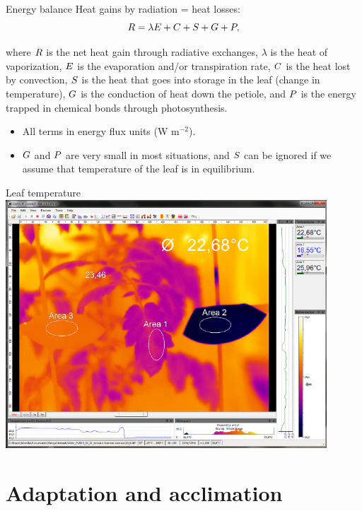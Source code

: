 \documentclass[10pt]{beamer}
\begin{document}
\begin{frame}{Energy balance}
    Heat gains by radiation = heat losses:
    $$\boldmath R = \lambda E + C + S + G + P,$$%
    \begin{small}
    where $\boldmath R$ is the net heat gain through radiative
    exchanges, $\lambda$ is the heat of vaporization, $\boldmath E$
    is the evaporation and/or transpiration rate, $\boldmath C$ is
    the heat lost by convection, $\boldmath S$ is the heat that goes
    into storage in the leaf (change in temperature), $\boldmath G$
    is the conduction of heat down the petiole, and $\boldmath P$ is
    the energy trapped in chemical bonds through photosynthesis.
    \begin{itemize}
        \item All terms in energy flux units (W m$^{-2}$).
        \item $\boldmath G$ and $\boldmath P$ are very small in
        most situations, and $\boldmath S$ can be ignored if we assume that
        temperature of the leaf is in equilibrium.
    \end{itemize}
    \end{small}
\end{frame}

\begin{frame}{Leaf temperature}
    \centering\includegraphics[width=0.9\textwidth]{figures/Tomato_IR_Valoya-}
\end{frame}

\section{Adaptation and acclimation}
\end{document}
